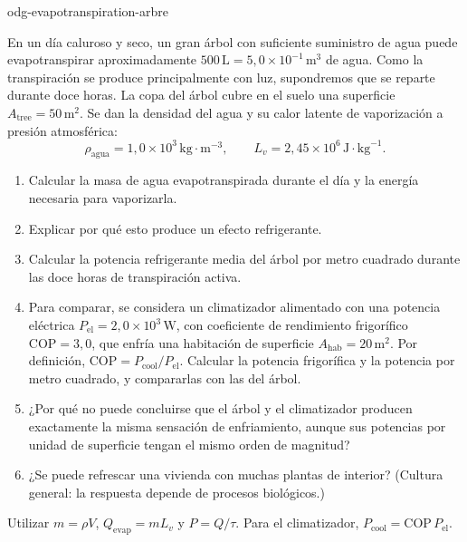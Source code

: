 \begin{exo}{odg-evapotranspiration-arbre}

En un día caluroso y seco, un gran árbol con suficiente suministro de agua puede evapotranspirar aproximadamente $500\,\text{L}=5{,}0\times10^{-1}\,\text{m}^3$ de agua. Como la transpiración se produce principalmente con luz, supondremos que se reparte durante doce horas. La copa del árbol cubre en el suelo una superficie $A_{\text{tree}}=50\,\text{m}^2$. Se dan la densidad del agua y su calor latente de vaporización a presión atmosférica:
\[
\rho_{\text{agua}}=1{,}0\times10^3\,\text{kg}\!\cdot\!\text{m}^{-3},
\qquad L_v=2{,}45\times10^6\,\text{J}\!\cdot\!\text{kg}^{-1}.
\]

\begin{enumerate}
  \item Calcular la masa de agua evapotranspirada durante el día y la energía necesaria para vaporizarla.
  \item Explicar por qué esto produce un efecto refrigerante.
  \item Calcular la potencia refrigerante media del árbol por metro cuadrado durante las doce horas de transpiración activa.
  \item Para comparar, se considera un climatizador alimentado con una potencia eléctrica $P_{\mathrm{el}}=2{,}0\times10^3\,\text{W}$, con coeficiente de rendimiento frigorífico $\mathrm{COP}=3{,}0$, que enfría una habitación de superficie $A_{\text{hab}}=20\,\text{m}^2$. Por definición, $\mathrm{COP}=P_{\text{cool}}/P_{\mathrm{el}}$. Calcular la potencia frigorífica y la potencia por metro cuadrado, y compararlas con las del árbol.
  \item ¿Por qué no puede concluirse que el árbol y el climatizador producen exactamente la misma sensación de enfriamiento, aunque sus potencias por unidad de superficie tengan el mismo orden de magnitud?
  \item ¿Se puede refrescar una vivienda con muchas plantas de interior? (Cultura general: la respuesta depende de procesos biológicos.)
\end{enumerate}

\begin{indication}
Utilizar $m=\rho V$, $Q_{\mathrm{evap}}=mL_v$ y $P=Q/\tau$. Para el climatizador, $P_{\text{cool}}=\mathrm{COP}\,P_{\mathrm{el}}$.
\end{indication}


\end{exo}
